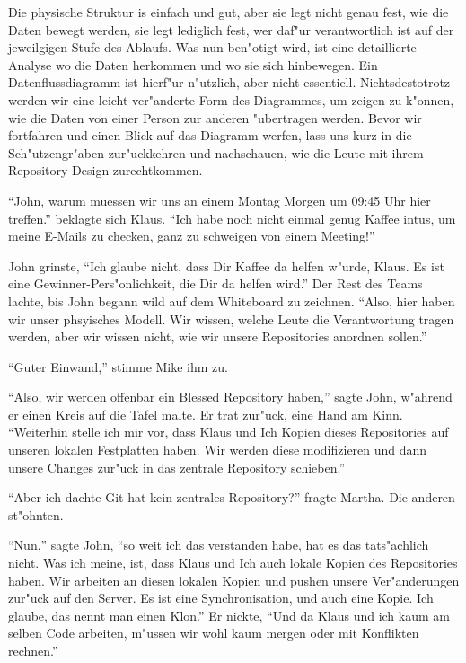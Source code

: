 Die physische Struktur is einfach und gut, aber sie legt nicht genau fest, wie die Daten bewegt werden, sie legt lediglich fest, wer daf"ur verantwortlich ist auf der jeweilgigen Stufe des Ablaufs. Was nun ben"otigt wird, ist eine detaillierte Analyse wo die Daten herkommen und wo sie sich hinbewegen. Ein Datenflussdiagramm ist hierf"ur n"utzlich, aber nicht essentiell. Nichtsdestotrotz werden wir eine leicht ver"anderte Form des Diagrammes, um zeigen zu k"onnen, wie die Daten von einer Person zur anderen "ubertragen werden. Bevor wir fortfahren und einen Blick auf das Diagramm werfen, lass uns kurz in die Sch"utzengr"aben zur"uckkehren und nachschauen, wie die Leute mit ihrem Repository-Design zurechtkommen.

\begin{trenches}
``John, warum muessen wir uns an einem Montag Morgen um 09:45 Uhr hier treffen.'' beklagte sich Klaus. ``Ich habe noch nicht einmal genug Kaffee intus, um meine E-Mails zu checken, ganz zu schweigen von einem Meeting!''

John grinste, ``Ich glaube nicht, dass Dir Kaffee da helfen w"urde, Klaus. Es ist eine Gewinner-Pers"onlichkeit, die Dir da helfen wird.'' Der Rest des Teams lachte, bis John begann wild auf dem Whiteboard zu zeichnen. ``Also, hier haben wir unser phsyisches Modell. Wir wissen, welche Leute die Verantwortung tragen werden, aber wir wissen nicht, wie wir unsere Repositories anordnen sollen.''

``Guter Einwand,'' stimme Mike ihm zu.

``Also, wir werden offenbar ein Blessed Repository haben,'' sagte John, w"ahrend er einen Kreis auf die Tafel malte. Er trat zur"uck, eine Hand am Kinn. ``Weiterhin stelle ich mir vor, dass Klaus und Ich Kopien dieses Repositories auf unseren lokalen Festplatten haben. Wir werden diese modifizieren und dann unsere Changes zur"uck in das zentrale Repository schieben.''

``Aber ich dachte Git hat kein zentrales Repository?'' fragte Martha. Die anderen st"ohnten.

``Nun,'' sagte John, ``so weit ich das verstanden habe, hat es das tats"achlich nicht. Was ich meine, ist, dass Klaus und Ich auch lokale Kopien des Repositories haben. Wir arbeiten an diesen lokalen Kopien und pushen unsere Ver"anderungen zur"uck auf den Server. Es ist eine Synchronisation, und auch eine Kopie. Ich glaube, das nennt man einen Klon.'' Er nickte, ``Und da Klaus und ich kaum am selben Code arbeiten, m"ussen wir wohl kaum mergen oder mit Konflikten rechnen.''


\end{trenches}
